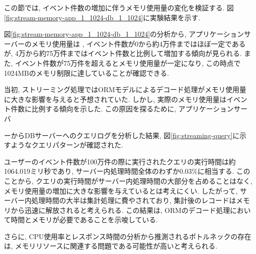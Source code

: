 \documentclass[../../../../../main]{subfiles}
\begin{document}
    \label{subsubsec:result-streaming-only-limit-memory}

    この節では, イベント件数の増加に伴うメモリ使用量の変化を検証する. 図\ref{fig:stream-memory-app_1_1024-db_1_1024}に実験結果を示す.

    

    図\ref{fig:stream-memory-app_1_1024-db_1_1024}の分析から, アプリケーションサーバーのメモリ使用量は , イベント件数が0から約4万件まではほぼ一定であるが, 4万から約75万件まではイベント件数と比例して増加する傾向が見られる. また, イベント件数が75万件を超えるとメモリ使用量が一定になり, この時点で1024MBのメモリ制限に達していることが確認できる.

    当初, ストリーミング処理ではORMモデルによるデコード処理がメモリ使用量に大きな影響を与えると予想されていた. しかし, 実際のメモリ使用量はイベント件数に比例する傾向を示した. この原因を探るために, アプリケーションサーバ

    ーからDBサーバーへのクエリログを分析した結果, 図\ref{fig:streaming-query}に示すようなクエリパターンが確認された.

    

    ユーザーのイベント件数が100万件の際に実行されたクエリの実行時間は約1064.019ミリ秒であり, サーバー内処理時間全体のわずか0.03\%に相当する. このことから, クエリの実行時間がサーバー内処理時間の大部分を占めることはなく, メモリ使用量の増加に大きな影響を与えているとは考えにくい. したがって, サーバー内処理時間の大半は集計処理に費やされており, 集計後のレコードはメモリから迅速に解放されると考えられる. この結果は, ORMのデコード処理において時間とメモリが必要であることを示唆している.

    さらに, CPU使用率とレスポンス時間の分析から推測されるボトルネックの存在は, メモリリソースに関連する問題である可能性が高いと考えられる.
\end{document}
